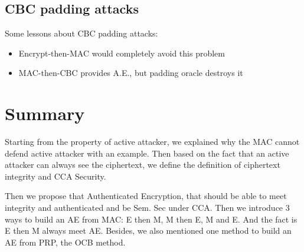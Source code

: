 \subsection{CBC padding attacks}

Some lessons about CBC padding attacks:
\begin{itemize}
    \item Encrypt-then-MAC would completely avoid this problem
    \item MAC-then-CBC provides A.E., but padding oracle destroys it
\end{itemize}

\section{Summary}

Starting from the property of active attacker, we explained why the MAC cannot defend active attacker with an example. Then based on the fact that an active attacker can always see the ciphertext, we define the definition of ciphertext integrity and CCA Security.

Then we propose that Authenticated Encryption, that should be able to meet integrity and authenticated and be Sem. Sec under CCA. Then we introduce 3 ways to build an AE from MAC: E then M, M then E, M and E. And the fact is E then M always meet AE. Besides, we also mentioned one method to build an AE from PRP, the OCB method.